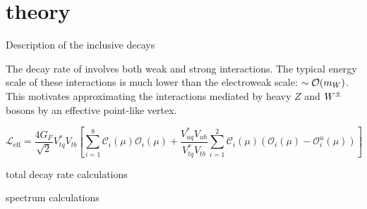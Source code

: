 \documentclass[xcolor=dvipsnames]{beamer}
\begin{document}
\section{\safeBtoXsdgamma theory}

\begin{frame}{Description of the inclusive decays}

   The decay rate of \BtoXsdgamma involves both weak and strong interactions.
The typical energy scale of these interactions is much lower than the electroweak scale: $\sim{\ensuremath{\cal O}}(m_W)$.
This motivates approximating the interactions mediated by heavy $Z$ and $W^\pm$ bosons by an effective point-like vertex.

   \begin{equation}\label{eq:effective_lagrangian}\nonumber
      \mathcal{L}_{\mathrm{eff}} = \frac{4G_F}{\sqrt{2}}V_{tq}^*V_{tb}\left[\sum^{8}_{i=1}\mathcal{C}_i(\mu)\mathcal{O}_i(\mu)
                                                  + \frac{V^*_{uq}V_{ub}}{V^*_{tq}V_{tb}}\sum^{2}_{i=1}\mathcal{C}_i(\mu)(\mathcal{O}_i(\mu)-\mathcal{O}_i^u(\mu))\right]
  \end{equation}

  

\end{frame}

\begin{frame}{\safeBtoXsdgamma total decay rate calculations}
   
\end{frame}

\begin{frame}{\safeBtoXsdgamma spectrum calculations}
   
\end{frame}
\end{document}
